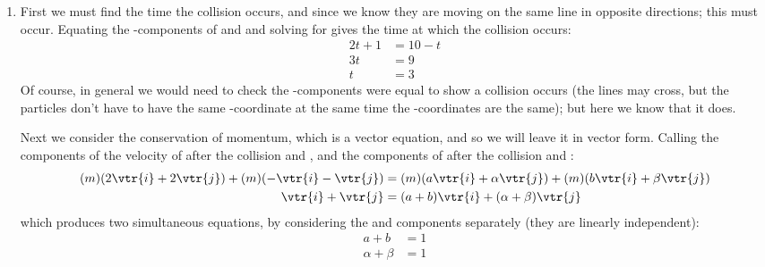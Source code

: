 \begin{problem}[A1988FMIVQ1a]
{\begin{enumerate}
A more rigorous method would be to consider the position vectors as two parametric equations for  and , then to find  and  then to use the Chain Rule to find
\begin{equation*} 
\frac{\d y}{\d x} = \frac{\left(\frac{\d y}{\d t}\right)}{\left( \frac{\d x}{\d t} \right)} = m
\end{equation*} 
for each particle. In both cases it comes out as , and then we find the intercept, , as above to show the particles move along a line of the form  where  and .
	\item First we must find the time the collision occurs, and since we know they are moving on the same line in opposite directions; this must occur. Equating the -components of  and  and solving for  gives the time at which the collision occurs:
\begin{align*} 
2t + 1 &= 10 -t \\ 
3t &= 9 \\ 
t &= 3 
\end{align*} Of course, in general we would need to check the -components were equal to show a collision occurs (the lines may cross, but the particles don't have to have the same -coordinate at the same time the -coordinates are the same); but here we know that it does.

Next we consider the conservation of momentum, which is a vector equation, and so we will leave it in vector form. Calling the components of the velocity of  after the collision  and \vari{\alpha}, and the components of  after the collision  and \vari{\beta}:
\begin{align*} 
(m)(2\vtr{i} + 2\vtr{j}) + (m)(-\vtr{i} - \vtr{j}) &= (m)(a\vtr{i} + \alpha\vtr{j}) + (m)(b\vtr{i} + \beta\vtr{j}) \\ 
\vtr{i} + \vtr{j} &= (a + b)\vtr{i} + (\alpha + \beta)\vtr{j}
\end{align*}
which produces two simultaneous equations, by considering the  and  components separately (they are linearly independent):
\begin{align} 
a + b &= 1 \label{CoM_vtr_i} \\ 
\alpha + \beta &= 1 \label{CoM_vtr_j} 
\end{align}


\end{enumerate}}
\end{problem}
